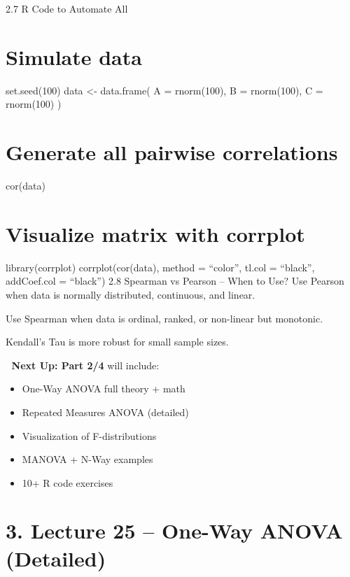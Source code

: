 \documentclass[
  letterpaper,
  DIV=11,
  numbers=noendperiod]{scrreprt}
\providecommand{\tightlist}{%
  \setlength{\itemsep}{0pt}\setlength{\parskip}{0pt}}
\begin{document}
2.7 R Code to Automate All

\section{Simulate data}\label{simulate-data}

set.seed(100) data \textless- data.frame( A = rnorm(100), B =
rnorm(100), C = rnorm(100) )

\section{Generate all pairwise
correlations}\label{generate-all-pairwise-correlations}

cor(data)

\section{Visualize matrix with
corrplot}\label{visualize-matrix-with-corrplot}

library(corrplot) corrplot(cor(data), method = ``color'', tl.col =
``black'', addCoef.col = ``black'') 2.8 Spearman vs Pearson -- When to
Use? Use Pearson when data is normally distributed, continuous, and
linear.

Use Spearman when data is ordinal, ranked, or non-linear but monotonic.

Kendall's Tau is more robust for small sample sizes.

👀 \textbf{Next Up: Part 2/4} will include:

\begin{itemize}
\tightlist
\item
  One-Way ANOVA full theory + math\\
\item
  Repeated Measures ANOVA (detailed)\\
\item
  Visualization of F-distributions\\
\item
  MANOVA + N-Way examples\\
\item
  10+ R code exercises
\end{itemize}

\section{3. Lecture 25 -- One-Way ANOVA
(Detailed)}\label{lecture-25-one-way-anova-detailed}
\end{document}
